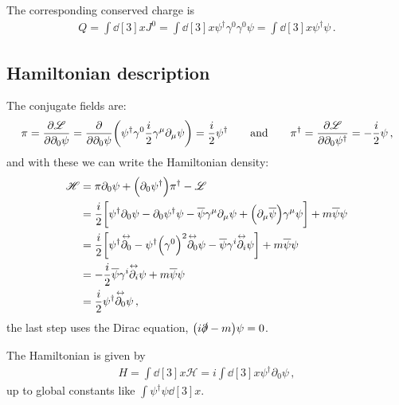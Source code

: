 \documentclass[main.tex]{subfiles}
\begin{document}
The corresponding conserved charge is 
%
\begin{align}
Q = \int \dd[3]{x} J^{0} = \int \dd[3]{x} \psi ^\dag \gamma^{0} \gamma^{0} \psi = \int \dd[3]{x} \psi ^\dag \psi 
\,.
\end{align}

\subsection{Hamiltonian description}

The conjugate fields are: 
%
\begin{align}
\pi = \pdv{\mathscr{L}}{\partial_0 \psi } = \pdv{}{\partial_0 \psi} \qty(\psi ^\dag \gamma^{0} \frac{i}{2} \gamma^{\mu } \partial_{\mu } \psi )= 
\frac{i}{2} \psi ^\dag
\qquad \text{and} \qquad
\pi ^\dag = \pdv{\mathscr{L}}{\partial_0 \psi ^\dag} = - \frac{i}{2} \psi 
\,,
\end{align}
%
and with these we can write the Hamiltonian density: 
%
\begin{subequations}
\begin{align}
\mathscr{H} &= \pi \partial_0 \psi + \qty(\partial_0 \psi ^\dag) \pi ^\dag - \mathscr{L}  \\
&= \frac{i}{2} \qty[ \psi ^\dag \partial_0 \psi - \partial_0 \psi ^\dag \psi - \overline{\psi} \gamma^{\mu } \partial_{\mu } \psi + \qty(\partial_{\mu } \overline{\psi})\gamma^{\mu } \psi ]
+m \overline{\psi} \psi   \\
&= \frac{i}{2} \qty[
\psi ^\dag \overset{\leftrightarrow}{\partial_0 } -
\psi ^\dag \qty(\gamma^{0})^2 \overset{\leftrightarrow}{\partial_0 }
\psi 
- \overline{\psi}  \gamma^{i}\overset{\leftrightarrow}{\partial_i }
\psi
]
+m \overline{\psi} \psi   \\
&= -\frac{i}{2} \overline{\psi}  \gamma^{i}\overset{\leftrightarrow}{\partial_i }
\psi
+ m \overline{\psi} \psi  \\
&= \frac{i}{2} \psi ^\dag \overset{\leftrightarrow}{\partial_0 } \psi 
\,,
\end{align}
\end{subequations}
%
the last step uses the Dirac equation, \(\qty(i \slashed{\partial} -m) \psi =0\).

The Hamiltonian is given by 
%
\begin{align}
H = \int \dd[3]{x} \mathscr{H} = i \int \dd[3]{x} \psi ^\dag \partial_0 \psi 
\,,
\end{align}
%
up to global constants like \(\int \psi ^\dag \psi \dd[3]{x}\). 
\end{document}
